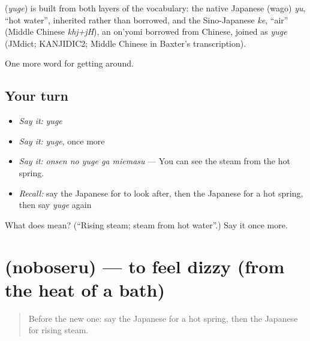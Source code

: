 \begin{cousinweb}
\textbf{} (\emph{yuge}) is built from both layers of the vocabulary: the native Japanese (wago) \emph{yu}, \textquotedblleft{}hot water\textquotedblright{}, inherited rather than borrowed, and the Sino-Japanese \emph{ke}, \textquotedblleft{}air\textquotedblright{} (Middle Chinese \emph{khj+jH}), an on'yomi borrowed from Chinese, joined as \emph{yuge} (JMdict; KANJIDIC2; Middle Chinese in Baxter's transcription).
\end{cousinweb}

\begin{grammarlens}[title={What you've built}]
One more word for getting around.
\end{grammarlens}

\subsection*{Your turn}
\begin{itemize}
\raggedright
  \item \emph{Say it:} \emph{yuge}
  \item \emph{Say it:} \emph{yuge}, once more
  \item \emph{Say it:} \emph{onsen no yuge ga miemasu} — You can see the steam from the hot spring.
  \item \emph{Recall:} say the Japanese for to look after, then the Japanese for a hot spring, then say \emph{yuge} again
\end{itemize}

\begin{tcolorbox}[breakable,colback=teal!4,colframe=teal!35!black,title={Before you move on}]
What does  mean? (\textquotedblleft{}Rising steam; steam from hot water\textquotedblright{}.) Say it once more.
\end{tcolorbox}
\section[\texorpdfstring{\ja{のぼせる} (noboseru)}{のぼせる (noboseru)}]{ (noboseru) — to feel dizzy (from the heat of a bath)}

\label{lesson:JA-C398-noboseru}



\begin{quote}
Before the new one: say the Japanese for a hot spring, then the Japanese for rising steam.
\end{quote}

